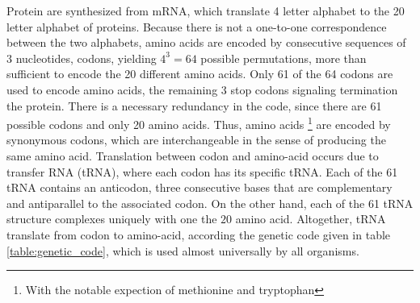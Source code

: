 Protein are synthesized from mRNA, which translate 4 letter alphabet to the 20 letter alphabet of proteins.
Because there is not a one-to-one correspondence between the two alphabets, amino acids are encoded by consecutive sequences of 3 nucleotides, codons, yielding $4^3=64$ possible permutations, more than sufficient to encode the 20 different amino acids.
Only 61 of the 64 codons are used to encode amino acids, the remaining 3 stop codons signaling termination the protein.
There is a necessary redundancy in the code, since there are 61 possible codons and only 20 amino acids.
Thus, amino acids \footnote{With the notable expection of methionine and tryptophan} are encoded by synonymous codons, which are interchangeable in the sense of producing the same amino acid. 
Translation between \gls{codon} and amino-acid occurs due to transfer \acrshort{RNA} (\acrshort{tRNA}), where each \gls{codon} has its specific \acrshort{tRNA}.
Each of the 61 \acrshort{tRNA} contains an anticodon, three consecutive bases that are complementary and antiparallel to the associated \gls{codon}. 
On the other hand, each of the 61 \acrshort{tRNA} structure complexes uniquely with one the $20$ amino acid.
Altogether, \acrshort{tRNA} translate from \gls{codon} to amino-acid, according the genetic code given in table \ref{table:genetic_code}, which is used almost universally by all organisms.

